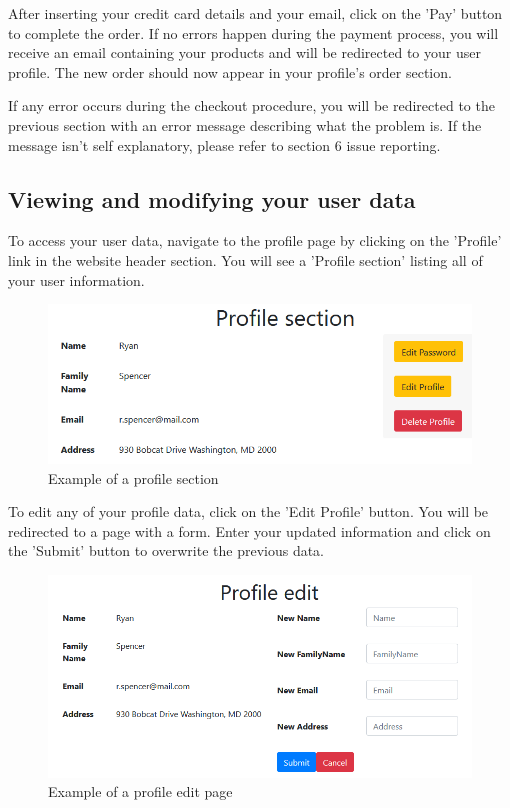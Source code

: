 After inserting your credit card details and your email, click on the 'Pay' button to complete the order. If no errors happen during the payment process, you will receive an email containing your products and will be redirected to your user profile. The new order should now appear in your profile's order section. 

If any error occurs during the checkout procedure, you will be redirected to the previous section with an error message describing what the problem is. If the message isn't self explanatory, please refer to section 6 issue reporting.

\subsection{Viewing and modifying your user data}
To access your user data, navigate to the profile page by clicking on the 'Profile' link in the website header section. You will see a 'Profile section' listing all of your user information.

\begin{figure}[H]
\centering
\includegraphics[scale=0.6]{res/Immagini/ProfilePage}
\caption{Example of a profile section}
\end{figure}

To edit any of your profile data, click on the 'Edit Profile' button. You will be redirected to a page with a form. Enter your updated information and click on the 'Submit' button to overwrite the previous data.

\begin{figure}[H]
\centering
\includegraphics[scale=0.6]{res/Immagini/ProfileEdit}
\caption{Example of a profile edit page}
\end{figure}

